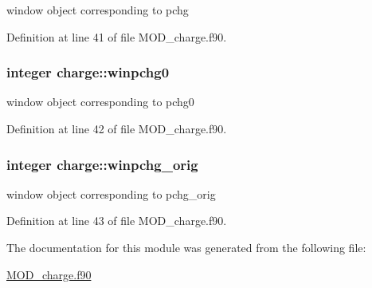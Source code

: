 window object corresponding to pchg 



Definition at line 41 of file M\-O\-D\-\_\-charge.\-f90.

\hypertarget{classcharge_aeef19bc488f8f88f255511cc1699a3bc}{
\subsubsection[{winpchg0}]{\setlength{\rightskip}{0pt plus 5cm}integer charge\-::winpchg0}}\label{classcharge_aeef19bc488f8f88f255511cc1699a3bc}


window object corresponding to pchg0 



Definition at line 42 of file M\-O\-D\-\_\-charge.\-f90.

\hypertarget{classcharge_af6924f1402ad3a9218fc27ba425ef6e0}{
\subsubsection[{winpchg\-\_\-orig}]{\setlength{\rightskip}{0pt plus 5cm}integer charge\-::winpchg\-\_\-orig}}\label{classcharge_af6924f1402ad3a9218fc27ba425ef6e0}


window object corresponding to pchg\-\_\-orig 



Definition at line 43 of file M\-O\-D\-\_\-charge.\-f90.



The documentation for this module was generated from the following file\-:\begin{DoxyCompactItemize}
\item 
\hyperlink{MOD__charge_8f90}{M\-O\-D\-\_\-charge.\-f90}\end{DoxyCompactItemize}
